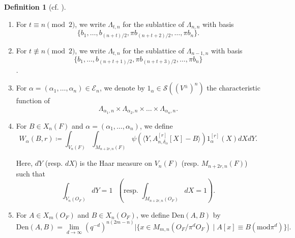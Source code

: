 \documentclass[11pt,oneside]{amsart}
\theoremstyle{plain}
\theoremstyle{definition}
\newtheorem{definition}[theorem]{Definition}
\theoremstyle{remark}
\newcommand{\CE}{{\mathcal E}}
\newcommand{\CS}{{\mathcal S}}
\newcommand{\alphad}{\mathrm{Den}}
\numberwithin{equation}{section}
\begin{document}
\begin{definition}[cf. {\cite[Definition 3.1]{Cho}}]
\begin{enumerate}
			\item For $t \equiv n \pmod{2}$, we write $\Lambda_{t,n}$ for the sublattice of $\Lambda_{n,n}$ with basis \begin{equation*}\lbrace b_1,\dots,b_{(n+t)/2},\pi b_{(n+t+2)/2},\dots,\pi b_n \rbrace.\end{equation*}
			
			\item For $t \not\equiv n \pmod{2}$, we write $\Lambda_{t,n}$ for the sublattice of $\Lambda_{n-1,n}$ with basis \begin{equation*} \lbrace b_1,\dots,b_{(n+t+1)/2},\pi b_{(n+t+3)/2},\dots,\pi b_n \rbrace\end{equation*}.
			
			
			
			\item For $\alpha=(\alpha_1,\dots,\alpha_n) \in \CE_n$, we denote by $1_{\alpha} \in \CS((V^{\pm})^n)$ the characteristic function of
			\begin{equation*}
				\Lambda_{\alpha_1,n}\times \Lambda_{\alpha_2,n}\times \dots \times \Lambda_{\alpha_n,n}.
			\end{equation*}
			
			\item 	For $B \in X_{n}(F)$ and $\alpha=(\alpha_1,\dots,\alpha_n)$, we define
			\begin{equation*}
				W_{\alpha}(B,r)\coloneqq \int_{V_{n}(F)}\int_{M_{n+2r,n}(F)}\psi(\langle Y,A_{n,\delta_{\alpha}}^{[r]}[X]-B\rangle)1_{\alpha}^{[r]}(X)dXdY.
			\end{equation*}
			
			Here, $dY$ (resp. $dX$) is the Haar measure on $V_{n}(F)$ (resp. $M_{n+2r,n}(F)$) such that
			\begin{equation*}
				\int_{V_{n}(O_F)}dY=1 \text{ }(\text{resp. }\int_{M_{n+2r,n}(O_F)}dX=1 ).
			\end{equation*}
			
			\item For $A \in X_m(O_F)$ and $B \in X_n(O_F)$, we define $\alphad(A,B)$ by
			\begin{equation*}
				\alphad(A,B)=\lim_{d \rightarrow \infty} (q^{-d})^{n(2m-n)}\vert \lbrace x \in M_{m,n}(O_F/\pi^dO_F) \mid A[x]\equiv B (\text{mod} \pi^d)\rbrace\vert.
			\end{equation*}
		\end{enumerate}
		
		
		
	\end{definition}
	
\end{document}
